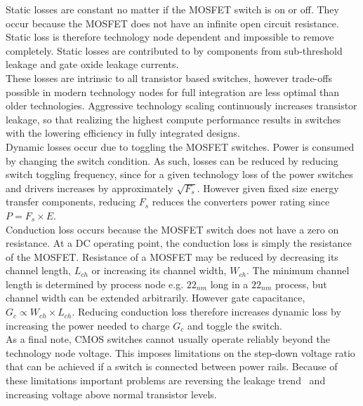 \documentclass[letterpaper,twocolumn,10pt]{article}
\begin{document}
Static losses are constant no matter if the MOSFET switch is on or off. They occur because the MOSFET does not have an infinite open circuit resistance. Static loss is therefore technology node dependent and impossible to remove completely. Static losses are contributed to by components from sub-threshold leakage and gate oxide leakage currents.\\
These losses are intrinsic to all transistor based switches, however trade-offs possible in modern technology nodes for full integration are less optimal than older technologies. Aggressive technology scaling continuously increases transistor leakage\cite{Iwai2009}, so that realizing the highest compute performance results in switches with the lowering efficiency in fully integrated designs.\\
Dynamic losses occur due to toggling the MOSFET switches. Power is consumed by changing the switch condition. As such, losses can be reduced by reducing switch toggling frequency, since for a given technology loss of the power switches and drivers increases by approximately $\sqrt{F_s}$\cite{Andreou1999}. However given fixed size energy transfer components, reducing $F_s$ reduces the converters power rating since $P = F_s \times E$.\\
Conduction loss occurs because the MOSFET switch does not have a zero on resistance. At a DC operating point, the conduction loss is simply the resistance of the MOSFET. Resistance of a MOSFET may be reduced by decreasing its channel length, $L_{ch}$ or increasing its channel width, $W_{ch}$. The minimum channel length is determined by process node e.g. $22_{nm}$ long in a $22_{nm}$ process, but channel width can be extended arbitrarily. However gate capacitance, $G_c \propto W_{ch} \times L_{ch}$. Reducing conduction loss therefore increases dynamic loss by increasing the power needed to charge $G_c$ and toggle the switch.\\  
\indent As a final note, CMOS switches cannot usually operate reliably beyond the technology node voltage. This imposes limitations on the step-down voltage ratio that can be achieved if a switch is connected between power rails. Because of these limitations important problems are reversing the leakage trend~\cite{Iwai2009} and increasing voltage above normal transistor levels.\\
\end{document}
